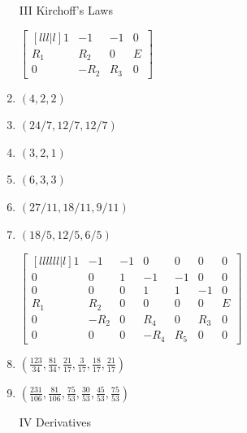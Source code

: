 \documentclass[10pt]{amsart}
\begin{document}
\begin{multicols}{2}
\begin{enumerate}
\item[III] Kirchoff's Laws

 $\begin{bmatrix}[lll|l]
 1 & -1 & -1 & 0 \\
 R_1 & R_2 & 0 & E \\
 0 & -R_2 & R_3 & 0
\end{bmatrix}$

\item $(4,2,2)$
\item $(24/7,12/7,12/7)$
\item $(3,2,1)$
\item $(6,3,3)$
\item $(27/11,18/11,9/11)$
\item $(18/5,12/5,6/5)$

$\begin{bmatrix}[llllll|l]
 1 & -1 & -1 & 0 & 0 & 0 & 0 \\
 0 & 0 & 1 & -1 & -1 & 0 & 0 \\
 0 & 0 & 0 & 1 & 1 & -1 & 0 \\
 R_1 & R_2 & 0 & 0 & 0 & 0 & E \\
 0 & -R_2 & 0 & R_4 & 0 & R_3 & 0 \\
 0 & 0 & 0 & -R_4 & R_5 & 0 & 0
\end{bmatrix}$

\item $\left(\frac{123}{34},\frac{81}{34},\frac{21}{17},\frac{3}{17},\frac{18}{17},\frac{21}{17}\right)$

\item $\left(\frac{231}{106},\frac{81}{106},\frac{75}{53},\frac{30}{53},\frac{45}{53},\frac{75}{53}\right)$

\item[IV] Derivatives


\end{enumerate}
\end{multicols}
\end{document}
